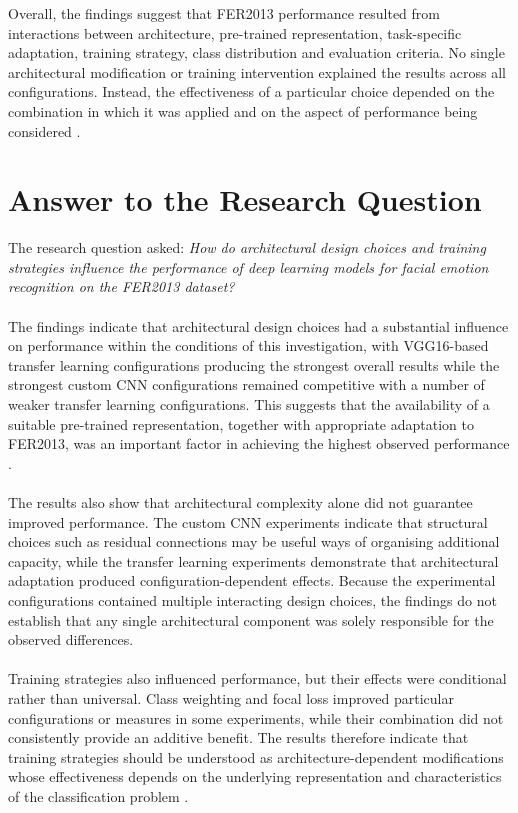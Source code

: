 \documentclass[12pt, a4paper]{report}
\let\oldsection\section
\renewcommand{\section}{%
    \Needspace{6\baselineskip}%
    \oldsection
}
\begin{document}
			Overall, the findings suggest that FER2013 performance resulted from interactions between architecture, pre-trained representation, task-specific adaptation, training strategy, class distribution and evaluation criteria. No single architectural modification or training intervention explained the results across all configurations. Instead, the effectiveness of a particular choice depended on the combination in which it was applied and on the aspect of performance being considered \cite{Georgiou2026FERReview, Pan2010TransferLearning}.
			
		\section{Answer to the Research Question}
			
			The research question asked: \textit{How do architectural design choices and training strategies influence the performance of deep learning models for facial emotion recognition on the FER2013 dataset?}\\\\
			The findings indicate that architectural design choices had a substantial influence on performance within the conditions of this investigation, with VGG16-based transfer learning configurations producing the strongest overall results while the strongest custom CNN configurations remained competitive with a number of weaker transfer learning configurations. This suggests that the availability of a suitable pre-trained representation, together with appropriate adaptation to FER2013, was an important factor in achieving the highest observed performance \cite{Pan2010TransferLearning, Georgiou2026FERReview}.\\\\
			The results also show that architectural complexity alone did not guarantee improved performance. The custom CNN experiments indicate that structural choices such as residual connections may be useful ways of organising additional capacity, while the transfer learning experiments demonstrate that architectural adaptation produced configuration-dependent effects. Because the experimental configurations contained multiple interacting design choices, the findings do not establish that any single architectural component was solely responsible for the observed differences.\\\\
			Training strategies also influenced performance, but their effects were conditional rather than universal. Class weighting and focal loss improved particular configurations or measures in some experiments, while their combination did not consistently provide an additive benefit. The results therefore indicate that training strategies should be understood as architecture-dependent modifications whose effectiveness depends on the underlying representation and characteristics of the classification problem \cite{lin2017focal, Johnson2019ClassImbalance, Hunafa2026FERImbalance}.\\\\
\end{document}
